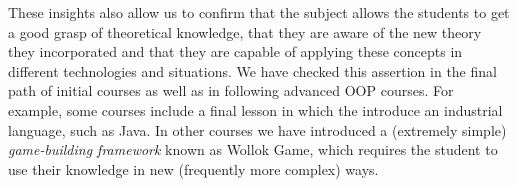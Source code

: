 These insights also allow us to confirm that the subject allows the students to get a good grasp of theoretical knowledge, 
that they are aware of the new theory they incorporated
and that they are capable of applying these concepts in different technologies and situations.
We have checked this assertion in the final path of initial courses as well as in following advanced OOP courses.
For example, some courses include a final lesson in which the introduce an industrial language, such as Java.
In other courses we have introduced a (extremely simple) \emph{game-building framework} known as Wollok Game,
which requires the student to use their knowledge in new (frequently more complex) ways.



%
%
%


%
%
%
%
%
